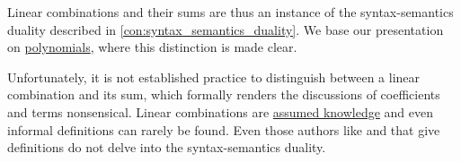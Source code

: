 \begin{comments}
  \item Linear combinations and their sums are thus an instance of the syntax-semantics duality described in \cref{con:syntax_semantics_duality}. We base our presentation on \hyperref[def:polynomial_algebra]{polynomials}, where this distinction is made clear.

  Unfortunately, it is not established practice to distinguish between a linear combination and its sum, which formally renders the discussions of coefficients and terms nonsensical. Linear combinations are \hyperref[con:assumed_knowledge]{assumed knowledge} and even informal definitions can rarely be found. Even those authors like  and  that give definitions do not delve into the syntax-semantics duality.
\end{comments}


